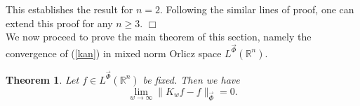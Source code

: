 \documentclass[11pt, a4paper]{article}
\newtheorem{thm}{Theorem}[section]
\theoremstyle{definition}
\newcommand{\qedwhite}{\hfill \ensuremath{\Box}}
\renewenvironment{proof}{{\raggedright \bfseries Proof.}}{\qedwhite}
\numberwithin{equation}{section}
\def\RR{\mathbb R}
\def\Chi{\mbox{\Large$\chi$}}
\newcommand{\priyanka}[1]{{\color{blue}{[PM: #1]}}}
\newcommand{\dlp}[1]{{\color{red}{[DP: #1]}}}
\begin{document}
\begin{proof}
This establishes the result for $n=2$. Following the similar lines of proof, one can extend this proof for any $n \geq 3.$
\end{proof}
\\

We now proceed to prove the main theorem of this section, namely the convergence of (\ref{kan}) in mixed norm Orlicz space $L^{\overrightarrow{\Phi}}(\RR^{n})$.

\begin{thm} \label{cg}
	Let $f\in L^{\overrightarrow{\Phi}}(\RR^{n})$ be fixed. Then we have
	$$ \lim_{w\to\infty}\|K_wf-f\|_{ \overrightarrow{\Phi}}=0. $$
\end{thm}
\end{document}
